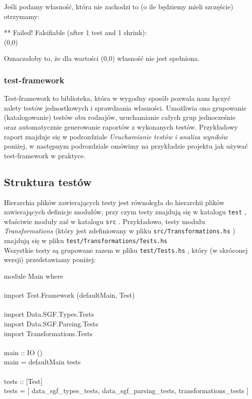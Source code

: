 \documentclass[10pt,leqno]{article}
\newcommand{\cmd}[1]{
  \texttt{#1}
}
\begin{document}
Jeśli podamy własność, która nie zachodzi to (o ile będziemy mieli szczęście) otrzymamy:

\begin{framed}
\noindent *** Failed! Falsifiable (after 1 test and 1 shrink):  \\
(0,0)
\end{framed}

\noindent Oznaczałoby to, że dla wartości (0,0) własność nie jest spełniona.

\subsubsection{test-framework}

Test-framework to biblioteka, która w wygodny sposób pozwala nam łączyć zalety testów 
jednostkowych i sprawdzania własności. Umożliwia ona grupowanie (katalogowanie) testów 
obu rodzajów, uruchamianie całych grup jednocześnie oraz automatycznie generowanie
raportów z wykonanych testów. Przykładowy raport znajduje się w podrozdziale 
\emph{Uruchamianie testów i analiza wyników} poniżej, w następnym podrozdziale omówimy
na przykładzie projektu jak używać test-framework w praktyce.

\subsection{Struktura testów}

Hierarchia plików zawierających testy jest równoległa do hierarchii plików zawierających definicje 
modułów, przy czym testy znajdują się w katalogu \cmd{test}, właściwie moduły zaś w katalogu \cmd{src}.
Przykładowo, testy modułu \emph{Transformations} (który jest zdefiniowany w pliku \cmd{src/Transformations.hs})
znajdują się w pliku \cmd{test/Transformations/Tests.hs} \\

\noindent Wszystkie testy są grupowane razem w pliku \cmd{test/Tests.hs}, który (w skróconej wersji) przedstawiamy poniżej:

\begin{framed}
\noindent module Main where \\
\\
import Test.Framework (defaultMain, Test) \\
\\
import Data.SGF.Types.Tests \\
import Data.SGF.Parsing.Tests \\ 
import Transformations.Tests \\
\\ 
main :: IO () \\
main = defaultMain tests \\
\\ 
tests :: [Test] \\
tests = [ data\_sgf\_types\_tests, data\_sgf\_parsing\_tests, transformations\_tests ]
\end{framed}
\end{document}
